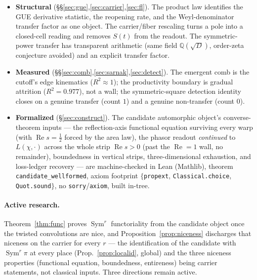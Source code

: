 \documentclass[11pt]{article}
\theoremstyle{definition}
\renewcommand{\Re}{\operatorname{Re}}
\newcommand{\Sym}{\operatorname{Sym}}
\begin{document}
\begin{itemize}
\item \textbf{Structural} (\S\S\ref{sec:gue},\ref{sec:carrier},\ref{sec:fl}). The product law
identifies the GUE derivative statistic, the reopening rate, and the Weyl-denominator transfer factor
as one object. The carrier/fiber rescaling turns a pole into a closed-cell reading and removes $S(t)$
from the readout. The symmetric-power transfer has transparent arithmetic (same field
$\mathbb Q(\sqrt D)$, order-zeta conjecture avoided) and an explicit transfer factor.

\item \textbf{Measured} (\S\S\ref{sec:comb},\ref{sec:sarnak},\ref{sec:detect}). The emergent comb is
the cutoff's edge kinematics ($R^2\approx1$); the productivity boundary is gradual attrition
($R^2=0.977$), not a wall; the symmetric-square detection identity closes on a genuine transfer
(count $1$) and a genuine non-transfer (count $0$).

\item \textbf{Formalized} (\S\ref{sec:construct}). The candidate automorphic object's converse-theorem
inputs --- the reflection-axis functional equation surviving every warp (with $\Re s=\tfrac12$ forced
by the area law), the phasor readout \emph{continued} to $L(\chi,\cdot)$ across the whole strip
$\Re s>0$ (past the $\Re=1$ wall, no remainder), boundedness in vertical strips, three-dimensional
exhaustion, and loss-ledger recovery --- are machine-checked in Lean (Mathlib), theorem
\texttt{candidate\_wellformed}, axiom footprint $\{$\texttt{propext}, \texttt{Classical.choice},
\texttt{Quot.sound}$\}$, no \texttt{sorry}/\texttt{axiom}, built in-tree.
\end{itemize}

\paragraph{Active research.} Theorem~\ref{thm:func} proves $\Sym^r$ functoriality from the candidate
object once the twisted convolutions are nice, and Proposition~\ref{prop:niceness} discharges that
niceness on the carrier for every $r$ --- the identification of the candidate with $\Sym^r\pi$ at every
place (Prop.~\ref{prop:localid}, global) and the three niceness properties (functional equation,
boundedness, entireness) being carrier statements, not classical inputs. Three directions remain active.
\end{document}
